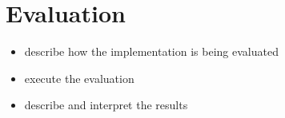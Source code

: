 \section{Evaluation}
\label{sec:evaluation}
\begin{itemize}
	\item describe how the implementation is being evaluated
	\item execute the evaluation
	\item describe and interpret the results
\end{itemize}